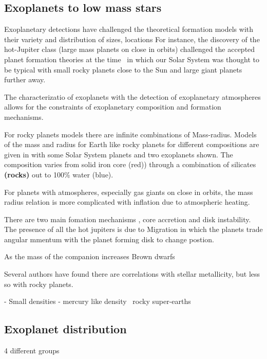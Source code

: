 


\subsection{Exoplanets to low mass stars}

Exoplanetary detections have challenged the theoretical formation models with their variety and distribution of sizes, locations For instance, the discovery of the hot-Jupiter class (large mass planets on close in orbits) challenged the accepted planet formation theories at the time~\citep[.e.g][]{pollack_formation_1996} in which our Solar System was thought to be typical with small rocky planets close to the Sun and large giant planets further away.

The characterizatio of exoplanets with the detection of exoplanetary atmospheres allows for the constraints of exoplanetary composition and formation mechanisms.

For rocky planets models there are infinite combinations of Mass-radius. Models of the mass and radius for Earth like rocky planets for different compositions are given in  with some Solar System planets and two exoplanets shown. The composition varies from solid iron core (red)) through a combination of silicates \textbf{(rocks)} out to 100\% water (blue).


For planets with atmospheres, especially gas giants on close in orbits, the mass radius relation is more complicated with inflation due to atmospheric heating. 



There are two main fomation mechanisms , core accretion and disk instability. The presence of all the hot jupiters is due to Migration in which the planets trade angular mmentum with the planet forming disk to change postion.

As the mass of the companion increases 
Brown dwarfs

Several authors have found there are correlations with stellar metallicity, but less so with rocky planets.


- Small densities - mercury like  density~\citet{dittmann_temperate_2017, santerne_earthsized_2018, ment_second_2018} rocky super-earths\\


\subsection{Exoplanet distribution} 4 different groups

